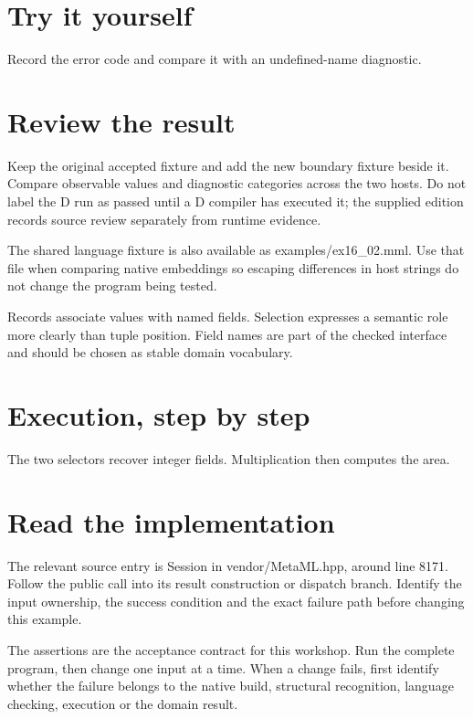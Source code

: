 \section*{Try it yourself}
Record the error code and compare it with an undefined-name diagnostic.

\section*{Review the result}
Keep the original accepted fixture and add the new boundary fixture beside it. Compare observable values and diagnostic categories across the two hosts. Do not label the D run as passed until a D compiler has executed it; the supplied edition records source review separately from runtime evidence.

The shared language fixture is also available as examples/ex16\_02.mml. Use that file when comparing native embeddings so escaping differences in host strings do not change the program being tested.

\clearpage
{}
Records associate values with named fields. Selection expresses a semantic role more clearly than tuple position. Field names are part of the checked interface and should be chosen as stable domain vocabulary.


\section*{Execution, step by step}
The two selectors recover integer fields. Multiplication then computes the area.

\section*{Read the implementation}
The relevant source entry is Session in vendor/MetaML.hpp, around line 8171. Follow the public call into its result construction or dispatch branch. Identify the input ownership, the success condition and the exact failure path before changing this example.

The assertions are the acceptance contract for this workshop. Run the complete program, then change one input at a time. When a change fails, first identify whether the failure belongs to the native build, structural recognition, language checking, execution or the domain result.

